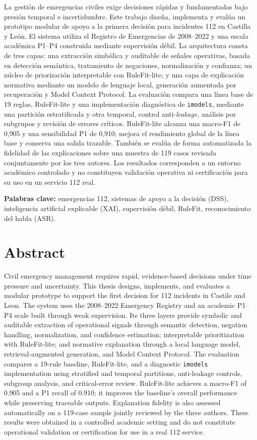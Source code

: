 \documentclass[11pt,a4paper,spanish, oneside]{book}
\numberwithin{equation}{chapter}
\numberwithin{figure}{chapter}
\begin{document}
La gestión de emergencias civiles exige decisiones rápidas y fundamentadas bajo presión temporal e incertidumbre. Este trabajo diseña, implementa y evalúa un prototipo modular de apoyo a la primera decisión para incidentes 112 en Castilla y León. El sistema utiliza el Registro de Emergencias de 2008--2022 y una escala académica P1--P4 construida mediante supervisión débil. La arquitectura consta de tres capas: una extracción simbólica y auditable de señales operativas, basada en detección semántica, tratamiento de negaciones, normalización y confianza; un núcleo de priorización interpretable con RuleFit-lite; y una capa de explicación normativa mediante un modelo de lenguaje local, generación aumentada por recuperación y Model Context Protocol. La evaluación compara una línea base de 19 reglas, RuleFit-lite y una implementación diagnóstica de \texttt{imodels}, mediante una partición estratificada y otra temporal, control anti-\textit{leakage}, análisis por subgrupos y revisión de errores críticos. RuleFit-lite alcanza una macro-F1 de 0,905 y una sensibilidad P1 de 0,910; mejora el rendimiento global de la línea base y conserva una salida trazable. También se evalúa de forma automatizada la fidelidad de las explicaciones sobre una muestra de 119 casos revisada conjuntamente por los tres autores. Los resultados corresponden a un entorno académico controlado y no constituyen validación operativa ni certificación para su uso en un servicio 112 real.

\medskip
\textbf{Palabras clave:} emergencias 112, sistemas de apoyo a la decisión (DSS), inteligencia artificial explicable (XAI), supervisión débil, RuleFit, reconocimiento del habla (ASR).

\chapter*{Abstract}

Civil emergency management requires rapid, evidence-based decisions under time pressure and uncertainty. This thesis designs, implements, and evaluates a modular prototype to support the first decision for 112 incidents in Castile and Leon. The system uses the 2008--2022 Emergency Registry and an academic P1--P4 scale built through weak supervision. Its three layers provide symbolic and auditable extraction of operational signals through semantic detection, negation handling, normalization, and confidence estimation; interpretable prioritization with RuleFit-lite; and normative explanation through a local language model, retrieval-augmented generation, and Model Context Protocol. The evaluation compares a 19-rule baseline, RuleFit-lite, and a diagnostic \texttt{imodels} implementation using stratified and temporal partitions, anti-leakage controls, subgroup analysis, and critical-error review. RuleFit-lite achieves a macro-F1 of 0.905 and a P1 recall of 0.910; it improves the baseline's overall performance while preserving traceable outputs. Explanation fidelity is also assessed automatically on a 119-case sample jointly reviewed by the three authors. These results were obtained in a controlled academic setting and do not constitute operational validation or certification for use in a real 112 service.
\end{document}
